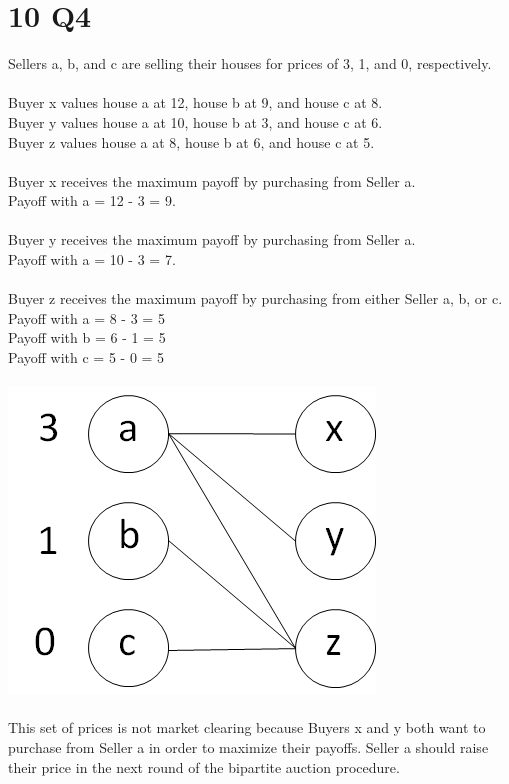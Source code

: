 \documentclass{article}
\begin{document}
\section{10 Q4}

Sellers a, b, and c are selling their houses for prices of 3, 1, and 0, respectively.\\\\
Buyer x values house a at 12, house b at 9, and house c at 8.\\
Buyer y values house a at 10, house b at 3, and house c at 6.\\
Buyer z values house a at 8, house b at 6, and house c at 5.\\
\\
Buyer x receives the maximum payoff by purchasing from Seller a.\\
\indent Payoff with a  = 12 - 3 = 9.\\\\
Buyer y receives the maximum payoff by purchasing from Seller a.\\
\indent Payoff with a = 10 - 3 = 7.\\\\
Buyer z receives the maximum payoff by purchasing from either Seller a, b, or c.\\
\indent Payoff with a = 8 - 3 = 5\\
\indent Payoff with b = 6 - 1 = 5\\
\indent Payoff with c = 5 - 0 = 5\\\\

\includegraphics{bipartite_graph1.png}\\\\
This set of prices is not market clearing because Buyers x and y both want to purchase from Seller a in order to maximize their payoffs. Seller a should raise their price in the next round of the bipartite auction procedure.
\end{document}
